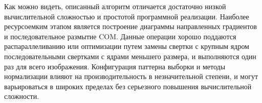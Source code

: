 {{{{	
		Как можно видеть, описанный алгоритм отличается достаточно низкой вычислительной сложностью и простотой программной реализации. Наиболее ресурсоемким этапом является построение диаграммы направленных градиентов и последовательное размытие COM. 
		Данные операции хорошо поддаются распараллеливанию или оптимизации путем замены свертки с крупным ядром последовательными свертками с ядрами меньшего размера, и выполняются один раз для всего изображения. Конфигурация паттерна выборки и методы нормализации влияют на производительность в незначительной степени, и могут варьироваться в широких пределах без серьезного повышения вычислительной сложности. 
	}
	\newpage
%   		
%   		
%   		
%   		
%   		
%   	
%   		
%   		
}}}
